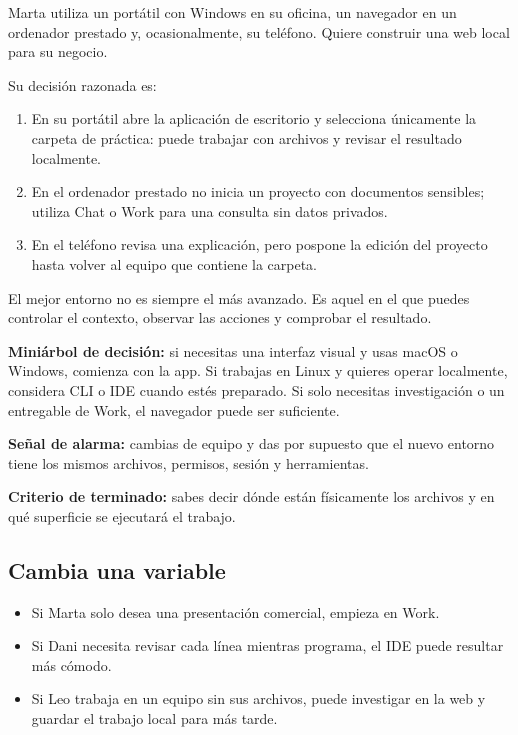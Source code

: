 \documentclass[10pt,a4paper,openany]{book}
\providecommand{\tightlist}{\setlength{\itemsep}{0.18em}\setlength{\parskip}{0pt}}
\begin{document}
Marta utiliza un portátil con Windows en su oficina, un navegador en un
ordenador prestado y, ocasionalmente, su teléfono. Quiere construir una
web local para su negocio.

Su decisión razonada es:

\begin{enumerate}
\def\labelenumi{\arabic{enumi}.}
\tightlist
\item
  En su portátil abre la aplicación de escritorio y selecciona
  únicamente la carpeta de práctica: puede trabajar con archivos y
  revisar el resultado localmente.
\item
  En el ordenador prestado no inicia un proyecto con documentos
  sensibles; utiliza Chat o Work para una consulta sin datos privados.
\item
  En el teléfono revisa una explicación, pero pospone la edición del
  proyecto hasta volver al equipo que contiene la carpeta.
\end{enumerate}

El mejor entorno no es siempre el más avanzado. Es aquel en el que
puedes controlar el contexto, observar las acciones y comprobar el
resultado.

\textbf{Miniárbol de decisión:} si necesitas una interfaz visual y usas
macOS o Windows, comienza con la app. Si trabajas en Linux y quieres
operar localmente, considera CLI o IDE cuando estés preparado. Si solo
necesitas investigación o un entregable de Work, el navegador puede ser
suficiente.

\begin{warningbox}

\textbf{Señal de alarma:} cambias de equipo y das por supuesto que el
nuevo entorno tiene los mismos archivos, permisos, sesión y
herramientas.

\end{warningbox}

\begin{successbox}

\textbf{Criterio de terminado:} sabes decir dónde están físicamente los
archivos y en qué superficie se ejecutará el trabajo.

\end{successbox}

\subsection{Cambia una variable}\label{cambia-una-variable-1}

\begin{itemize}
\tightlist
\item
  Si Marta solo desea una presentación comercial, empieza en Work.
\item
  Si Dani necesita revisar cada línea mientras programa, el IDE puede
  resultar más cómodo.
\item
  Si Leo trabaja en un equipo sin sus archivos, puede investigar en la
  web y guardar el trabajo local para más tarde.
\end{itemize}
\end{document}
